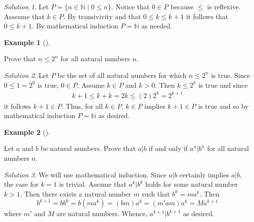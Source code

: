 \documentclass[
  twoside,
  12pt,
  letterpaper]{article}
\theoremstyle{definition}
\theoremstyle{plain}
\theoremstyle{plain}
\theoremstyle{definition}
\newtheorem{example}{Example}[section]
\theoremstyle{definition}
\theoremstyle{remark}
\newtheorem*{solution}{Solution}
\begin{document}
\begin{solution}

Let \(P=\{n\in \mathbb{N} \mid 0 \leq n \}\). Notice that \(0\in P\)
because \(\leq\) is reflexive. Asssume that \(k\in P\). By transivivity
and that \(0\leq k \leq k+1\) it follows that \(0\leq k+1.\) By
mathematical induction \(P=\mathbb{N}\) as needed.

\end{solution}

\begin{example}[]\protect\hypertarget{exm-ordering-one}{}\label{exm-ordering-one}

Prove that \(n\leq 2^n\) for all natural numbers \(n.\)

\end{example}

\begin{solution}

Let \(P\) be the set of all natural numbers for which \(n\leq 2^n\) is
true. Since \(0\leq 1=2^0\) is true, \(0\in P.\) Assume \(k\in P\) and
\(k>0\). Then \(k\leq 2^k\) is true and since \begin{align}
k+1 \leq k+k = 2k \leq (2) 2^k = 2^{k+1}
\end{align} it follows \(k+1\in P.\) Thus, for all \(k\in P\),
\(k\in P\) implies \(k+1\in P\) is true and so by mathematical induction
\(P=\mathbb{N}\) as desired.

\end{solution}

\begin{example}[]\protect\hypertarget{exm-div-powers}{}\label{exm-div-powers}

Let \(a\) and \(b\) be natural numbers. Prove that \(a|b\) if and only
if \(a^n|b^n\) for all natural numbers \(n.\)

\end{example}

\begin{solution}

We will use mathematical induction. Since \(a|b\) certainly implies
\(a|b,\) the case for \(k=1\) is trivial. Assume that \(a^k|b^k\) holds
for some natural number \(k>1\). Then there exists a natural number
\(m\) such that \(b^k=m a^k.\) Then \begin{equation}
b^{k+1}=b b^k
=b \left(m a^k\right)
=(b m )a^k
=(m' a m )a^k
=M a^{k+1}
\end{equation} where \(m'\) and \(M\) are natural numbers. Whence,
\(a^{k+1}|b^{k+1}\) as desired.

\end{solution}
\end{document}
